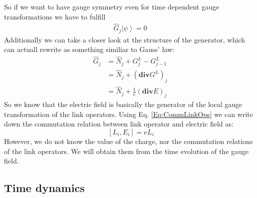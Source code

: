 \documentclass[10pt]{article}
\newcommand{\ket}[1]{\ensuremath{\left|#1\right\rangle}}
\newcommand{\ch}{e}
\begin{document}
So if we want to have gauge symmetry even for time dependent gauge transformations we have to fulfill
\begin{align}
\hat{G}_j\ket{\psi} = 0
\end{align}
Additionally we can take a closer look at the structure of the generator, which can actuall rewrite as something similiar to Gauss' law:
\begin{eqnarray}
\hat{G}_j &= \hat{N}_j + G^L_j - G^L_{j-1} \\
&= \hat{N}_j + (\mathbf{div}G^L)_j\\
&= \hat{N}_j + \frac{1}{\ch}(\mathbf{div}E)_j
\end{eqnarray}
So we know that the electric field is basically the generator of the local gauge transformation of the link operators. Using Eq. \eqref{Eq:CommLinkOps} we can write down the commutation relation between link operator and electric field as:
\begin{equation}
~[L_i,E_i] = \ch L_i
\end{equation}
However, we do not know the value of the charge, nor the commutation relations of the link operators. We will obtain them from the time evolution of the gauge field.

\subsection{Time dynamics}\label{Sec:TD}
 
\end{document}
